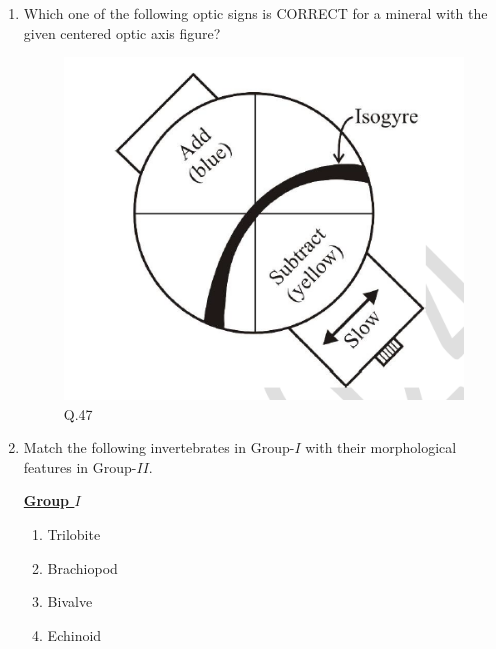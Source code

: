 \documentclass[journal,12pt,onecolumn]{IEEEtran}
\theoremstyle{remark}
\begin{document}
\begin{enumerate}
\item Which one of the following optic signs is CORRECT for a mineral with the given centered optic axis figure?
\begin{figure}[H]
    \centering
    \includegraphics[width=0.4\columnwidth]{Figs/fig_5.png}
    \caption{Q.47}
    \label{fig:q47}
\end{figure}
\begin{enumerate}
\end{enumerate}
\hfill{}

\item Match the following invertebrates in Group-$I$ with their morphological features in Group-$II$.

\begin{multicols}{2}
            \underline{\textbf{Group $I$}}
            \begin{enumerate}[start =16]
                \item Trilobite
                \item Brachiopod
                \item Bivalve
                \item Echinoid
            \end{enumerate}

            \columnbreak


\end{multicols}
\end{enumerate}
\end{document}
